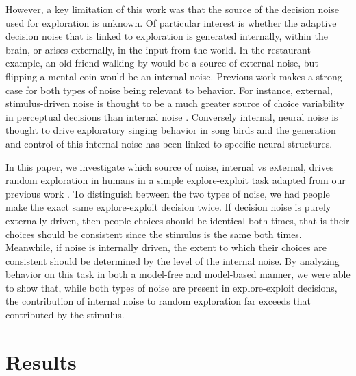 \documentclass[12pt]{article}
\begin{document}
	However, a key limitation of this work was that the source of the decision noise used for exploration is unknown. Of particular interest is whether the adaptive decision noise that is linked to exploration is generated internally, within the brain, or arises externally, in the input from the world. In the restaurant example, an old friend walking by would be a source of external noise, but flipping a mental coin would be an internal noise. Previous work makes a strong case for both types of noise being relevant to behavior. For instance, external, stimulus-driven noise is thought to be a much greater source of choice variability in perceptual decisions than internal noise \citep{eeBrunton13}. Conversely internal, neural noise is thought to drive exploratory singing behavior in song birds  \citep{songbird2} and the generation and control of this internal noise has been linked to specific neural structures. 
	
	In this paper, we investigate which source of noise, internal vs external, drives random exploration in humans in a simple explore-exploit task adapted from our previous work \citep{wilson2014}. To distinguish between the two types of noise, we had people make the exact same explore-exploit decision twice. If decision noise is purely externally driven, then people choices should be identical both times, that is their choices should be consistent since the stimulus is the same both times. Meanwhile, if noise is internally driven, the extent to which their choices are consistent should be determined by the level of the internal noise. By analyzing behavior on this task in both a model-free and model-based manner, we were able to show that, while both types of noise are present in explore-exploit decisions, the contribution of internal noise to random exploration far exceeds that contributed by the stimulus.
	
	
	
	
	
	\section*{Results}
	
\end{document}
